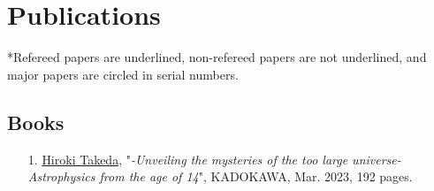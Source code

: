 \documentclass[uplatex, 12pt]{article}
\begin{document}
\section*{Publications}
*Refereed papers are underlined, non-refereed papers are not underlined, and major papers are circled in serial numbers.

\subsection*{Books}
\begin{enumerate}
\item[{1}.] \uline{Hiroki Takeda}, "\emph{-Unveiling the mysteries of the too large universe- Astrophysics from the age of 14}", KADOKAWA, Mar. 2023, 192 pages.
\end{enumerate}

\noindent
\end{document}
